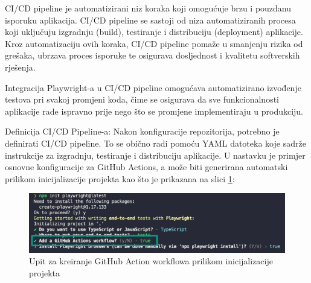 CI/CD pipeline je automatizirani niz koraka koji omogućuje brzu i pouzdanu isporuku aplikacija. CI/CD pipeline se sastoji od niza automatiziranih procesa koji uključuju izgradnju (build), testiranje i distribuciju (deployment) aplikacije. 
Kroz automatizaciju ovih koraka, CI/CD pipeline pomaže u smanjenju rizika od grešaka, ubrzava proces isporuke te osigurava dosljednost i kvalitetu softverskih rješenja.


Integracija Playwright-a u CI/CD pipeline omogućava automatizirano izvođenje testova pri svakoj promjeni koda, čime se osigurava da sve funkcionalnosti aplikacije rade ispravno prije nego što se promjene implementiraju u produkciju.

Definicija CI/CD Pipeline-a: Nakon konfiguracije repozitorija, potrebno je definirati CI/CD pipeline. To se obično radi pomoću YAML datoteka koje sadrže instrukcije za izgradnju, testiranje i distribuciju aplikacije. U nastavku je primjer osnovne konfiguracije za GitHub Actions, a može biti generirana automatski prilikom inicijalizacije projekta kao što je prikazana na slici \ref{img:ghActionPrompt}:

\begin{figure}[!h]\begin{center}
  \includegraphics[width=1\textwidth]{"img/ghActionPrompt"}
  \caption{Upit za kreiranje GitHub Action workflowa prilikom inicijalizacije projekta}\label{img:ghActionPrompt}
\end{center}\end{figure}

